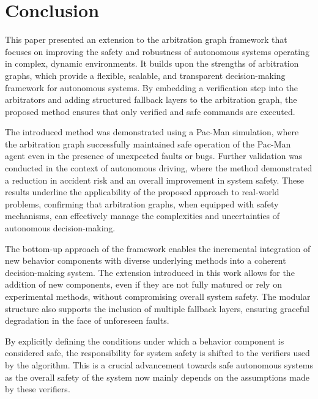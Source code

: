 \section{Conclusion}
This paper presented an extension to the arbitration graph framework that focuses on improving the safety and robustness of autonomous systems operating in complex, dynamic environments.
It builds upon the strengths of arbitration graphs, which provide a flexible, scalable, and transparent decision-making framework for autonomous systems.
By embedding a verification step into the arbitrators and adding structured fallback layers to the arbitration graph,
the proposed method ensures that only verified and safe commands are executed.

The introduced method was demonstrated using a Pac-Man simulation, where the arbitration graph successfully maintained safe operation of the Pac-Man agent even in the presence of unexpected faults or bugs.
%
Further validation was conducted in the context of autonomous driving, where the method demonstrated a reduction in accident risk and an overall improvement in system safety.
These results underline the applicability of the proposed approach to real-world problems, 
confirming that arbitration graphs, when equipped with safety mechanisms, 
can effectively manage the complexities and uncertainties of autonomous decision-making.

The bottom-up approach of the framework enables the incremental integration of new behavior components with diverse underlying methods into a coherent decision-making system.
The extension introduced in this work allows for the addition of new components, even if they are not fully matured or rely on experimental methods, without compromising overall system safety.
The modular structure also supports the inclusion of multiple fallback layers, ensuring graceful degradation in the face of unforeseen faults.

By explicitly defining the conditions under which a behavior component is considered safe,
the responsibility for system safety is shifted to the verifiers used by the algorithm.
This is a crucial advancement towards safe autonomous systems as
the overall safety of the system now mainly depends on the assumptions made by these verifiers.

